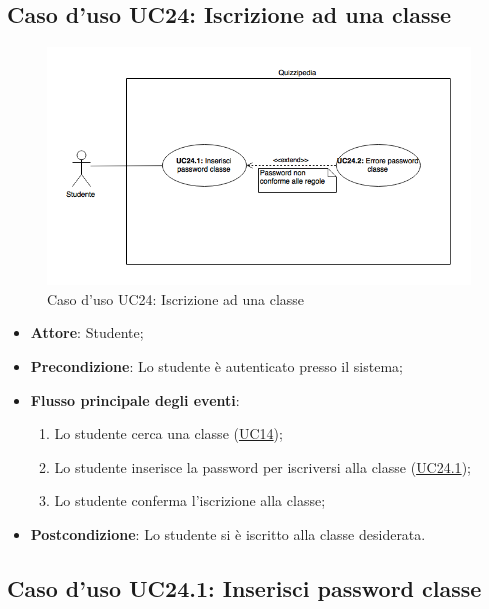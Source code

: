 \documentclass[12pt,a4paper]{article}
\begin{document}
\subsection{Caso d'uso UC24: Iscrizione ad una classe}
\begin{figure}[H]
	\centering
	\includegraphics[width=\textwidth]{diagramUC24.png}
	\caption{Caso d'uso UC24: Iscrizione ad una classe}\label{fig:UC24} 
\end{figure}
\begin{itemize}

\item \textbf{Attore}: Studente; 
\item \textbf{Precondizione}: Lo studente è autenticato presso il sistema;

\item \textbf{Flusso principale degli eventi}:
\begin{enumerate}
	\item Lo studente cerca una classe (\hyperlink{UC14}{UC14});
	\item Lo studente inserisce la password per iscriversi alla classe (\hyperlink{UC24.1}{UC24.1});
	\item Lo studente conferma l'iscrizione alla classe;
	
\end{enumerate}
\item \textbf{Postcondizione}: Lo studente si è iscritto alla classe desiderata.
\end{itemize}
\hypertarget{UC24.1}{}
\subsection{Caso d'uso UC24.1: Inserisci password classe}
\end{document}
